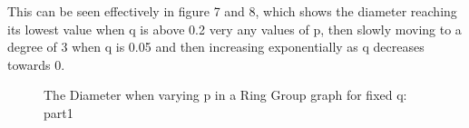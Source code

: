 \documentclass[12pt,a4paper]{article}
\begin{document}
This can be seen effectively in figure 7 and 8, which shows the diameter reaching its lowest value when q is above 0.2 very any values of p, then slowly moving to a degree of 3 when q is 0.05 and then increasing exponentially as q decreases towards 0.
\begin{figure}[h]
	\centering
	\qquad
	\caption{The Diameter when varying p in a Ring Group graph for fixed q: part1}
	\label{diameters}
\end{figure}
\end{document}
